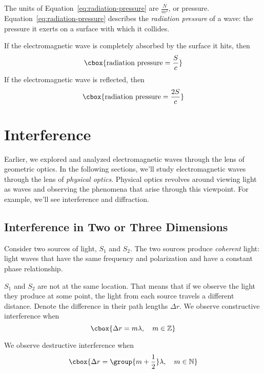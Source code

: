 \documentclass{hw}
\numberwithin{equation}{section}
\begin{document}
The units of Equation~\ref{eq:radiation-pressure} are $\frac{N}{m^2}$, or
pressure. Equation~\ref{eq:radiation-pressure} describes the \emph{radiation
pressure} of a wave: the pressure it exerts on a surface with which it
collides.

If the electromagnetic wave is completely absorbed by the surface it hits, then
\begin{equation}
  \cbox{\text{radiation pressure} = \frac{S}{c}}
\end{equation}
If the electromagnetic wave is reflected, then 
\begin{equation}
  \cbox{\text{radiation pressure} = \frac{2S}{c}}
\end{equation}

\section{Interference}\label{sec:interference}
Earlier, we explored and analyzed electromagnetic waves through the lens of
geometric optics. In the following sections, we'll study electromagnetic waves
through the lens of \emph{physical optics}. Physical optics revolves around
viewing light as waves and observing the phenomena that arise through this
viewpoint. For example, we'll see interference and diffraction.

\subsection{Interference in Two or Three Dimensions}
Consider two sources of light, $S_1$ and $S_2$. The two sources produce
\emph{coherent} light: light waves that have the same frequency and
polarization and have a constant phase relationship. 

$S_1$ and $S_2$ are not at the same location. That means that if we observe the
light they produce at some point, the light from each source travels a
different distance. Denote the difference in their path lengths $\Delta r$. We
observe constructive interference when 
\begin{equation}\label{eq:constructive}
  \cbox{\Delta r = m \lambda, \quad m \in \mathbb{Z}}
\end{equation}

We observe destructive interference when
\begin{equation}\label{eq:destructive}
  \cbox{\Delta r = \group{m + \frac{1}{2}} \lambda, \quad m \in \mathbb{N}}
\end{equation}
\end{document}

